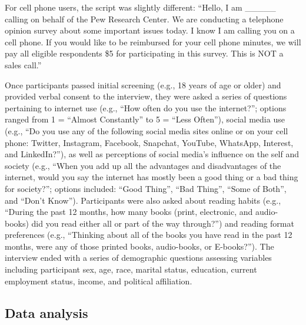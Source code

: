 \documentclass[man, fleqn, noextraspace]{apa6}
\theoremstyle{definition}
\theoremstyle{definition}
\theoremstyle{definition}
\theoremstyle{remark}
\begin{document}
For cell phone users, the script was slightly different: \enquote{Hello,
I am \_\_\_\_\_ calling on behalf of the Pew Research Center. We are
conducting a telephone opinion survey about some important issues today.
I know I am calling you on a cell phone. If you would like to be
reimbursed for your cell phone minutes, we will pay all eligible
respondents \$5 for participating in this survey. This is NOT a sales
call.}

Once participants passed initial screening (e.g., 18 years of age or
older) and provided verbal consent to the interview, they were asked a
series of questions pertaining to internet use (e.g., \enquote{How often
do you use the internet?}; options ranged from 1 = \enquote{Almost
Constantly} to 5 = \enquote{Less Often}), social media use (e.g.,
\enquote{Do you use any of the following social media sites online or on
your cell phone: Twitter, Instagram, Facebook, Snapchat, YouTube,
WhatsApp, Interest, and LinkedIn?}), as well as perceptions of social
media's influence on the self and society (e.g., \enquote{When you add
up all the advantages and disadvantages of the internet, would you say
the internet has mostly been a good thing or a bad thing for society?};
options included: \enquote{Good Thing}, \enquote{Bad Thing},
\enquote{Some of Both}, and \enquote{Don't Know}). Participants were
also asked about reading habits (e.g., \enquote{During the past 12
months, how many books (print, electronic, and audio-books) did you read
either all or part of the way through?}) and reading format preferences
(e.g., \enquote{Thinking about all of the books you have read in the
past 12 months, were any of those printed books, audio-books, or
E-books?}). The interview ended with a series of demographic questions
assessing variables including participant sex, age, race, marital
status, education, current employment status, income, and political
affiliation.

\subsection{Data analysis}\label{data-analysis}
\end{document}
